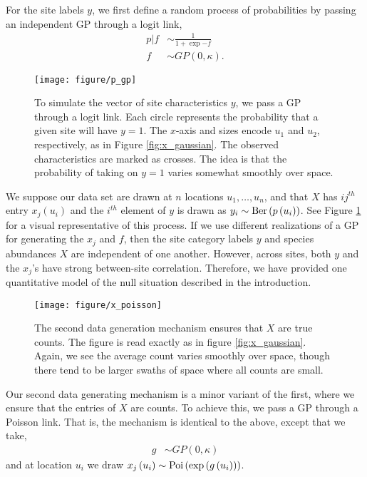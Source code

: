 \documentclass{article}
\begin{document}
For the site labels $y$, we first define a random process of probabilities by
passing an independent GP through a logit link,
\begin{align}
  p \vert f &\sim \frac{1}{1 + \exp{-f}} \\
  f &\sim GP\left(0, \kappa\right).
\end{align}

\begin{figure}[ht]
  \centering
  \texttt{[image: figure/p\_gp]}
  \caption{\label{fig:p_gp} To simulate the vector of site characteristics $y$,
    we pass a GP through a logit link. Each circle represents the probability
    that a given site will have $y = 1$. The $x$-axis and sizes encode $u_{1}$
    and $u_{2}$, respectively, as in Figure \ref{fig:x_gaussian}. The observed
    characteristics are marked as crosses. The idea is that the probability of
    taking on $y = 1$ varies somewhat smoothly over space.}
\end{figure}

We suppose our data set are drawn at $n$ locations $u_{1}, \dots, u_{n}$, and
that $X$ has $ij^{th}$ entry $x_{j}\left(u_{i}\right)$ and the $i^{th}$ element
of $y$ is drawn as $y_{i} \sim \textnormal{Ber}\left(p\left(u_{i}\right)\right)$. See Figure
\ref{fig:p_gp} for a visual representative of this process. If we use different
realizations of a GP for generating the $x_{j}$ and $f$, then the site category
labels $y$ and species abundances $X$ are independent of one another. However,
across sites, both $y$ and the $x_{j}$'s have strong between-site correlation.
Therefore, we have provided one quantitative model of the null situation
described in the introduction.

\begin{figure}
  \centering
  \texttt{[image: figure/x\_poisson]}
  \caption{\label{fig:x_poisson} The second data generation mechanism ensures
    that $X$ are true counts. The figure is read exactly as in figure
    \ref{fig:x_gaussian}. Again, we see the average count varies smoothly over
    space, though there tend to be larger swaths of space where all counts are
    small.}
\end{figure}

Our second data generating mechanism is a minor variant of the first, where
we ensure that the entries of $X$ are counts. To achieve this, we pass a GP
through a Poisson link. That is, the mechanism is identical to the above,
except that we take,
\begin{align}
  g &\sim GP\left(0, \kappa\right)
\end{align}
and at location $u_{i}$ we draw
$x_{j}\left(u_{i}\right) \sim \textnormal{Poi}\left(\operatorname{exp}\left(g\left(u_{i}\right)\right)\right)$.
\end{document}
